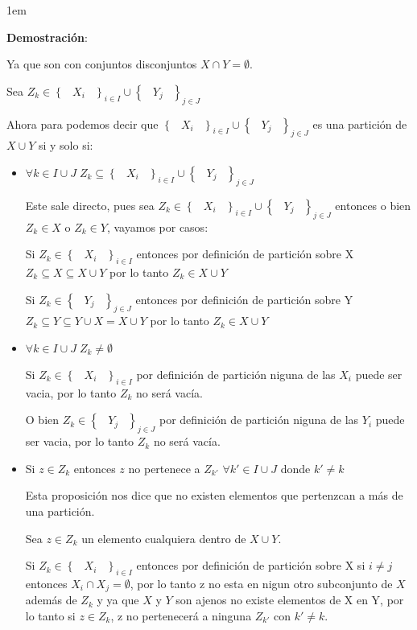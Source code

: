 \documentclass[12pt, fleqn]{article}                             %
\newenvironment{SmallIndentation}[1][0.75em]                    %
    {\begin{adjustwidth}{#1}{}\begin{footnotesize}}                 %
    {\end{footnotesize}\end{adjustwidth}}                           %
\DeclareMathOperator \Space {\quad}                             %
\DeclareMathOperator \MiniSpace {\;}                            %
\newcommand{\Set}[1]{\left\{ \MiniSpace #1 \MiniSpace \right\}} %
\begin{document}
    \begin{SmallIndentation}[1em]
        \textbf{Demostración}:
        
        Ya que son con conjuntos disconjuntos $X \cap Y = \emptyset$.

        Sea $Z_k \in \Set{X_i}_{i \in I} \cup \Set{Y_j}_{j \in J}$

        Ahora para podemos decir que $\Set{X_i}_{i \in I} \cup \Set{Y_j}_{j \in J}$ es una partición de $X \cup Y$
        si y solo si:

        \begin{itemize}
            \item $\forall k \in I \cup J \; Z_k \subseteq \Set{X_i}_{i \in I} \cup \Set{Y_j}_{j \in J}$

                Este sale directo, pues sea $Z_k \in \Set{X_i}_{i \in I} \cup \Set{Y_j}_{j \in J}$
                entonces o bien $Z_k \in X$ o $Z_k \in Y$, vayamos por casos:

                Si $Z_k \in \Set{X_i}_{i \in I}$ entonces por definición de partición sobre X
                $Z_k \subseteq X \subseteq X \cup Y$ por lo tanto $Z_k \in X \cup Y$

                Si $Z_k \in \Set{Y_j}_{j \in J}$ entonces por definición de partición sobre Y
                $Z_k \subseteq Y \subseteq Y \cup X = X \cup Y$ por lo tanto $Z_k \in X \cup Y$

            \item $\forall k \in I \cup J \; Z_k \neq \emptyset$

                Si $Z_k \in \Set{X_i}_{i \in I}$ por definición de partición niguna de las $X_i$ puede
                ser vacia, por lo tanto $Z_k$ no será vacía.

                O bien $Z_k \in \Set{Y_j}_{j \in J}$ por definición de partición niguna de las $Y_i$ puede
                ser vacia, por lo tanto $Z_k$ no será vacía.

            \item Si $z \in Z_k$ entonces $z$ no pertenece a $Z_{k'}$ $\forall k' \in I \cup J$ donde $k' \neq k$

                Esta proposición nos dice que no existen elementos que pertenzcan a más de una partición.

                Sea $z \in Z_k$ un elemento cualquiera dentro de $X \cup Y$.

                Si $Z_k \in \Set{X_i}_{i \in I}$ entonces por definición de partición sobre X 
                si $i \neq j$ entonces $X_i \cap X_j = \emptyset$, por lo tanto z no esta en nigun otro subconjunto
                de $X$ además de $Z_k$ y ya que $X$ y $Y$ son ajenos no existe elementos de X en Y, por lo tanto
                si $z \in Z_k$, z no pertenecerá a ninguna $Z_{k'}$ con $k' \neq k$.


\end{itemize}
\end{SmallIndentation}
\end{document}
